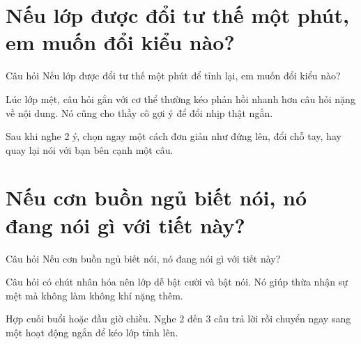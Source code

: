 \section{Nếu lớp được đổi tư thế một phút, em muốn đổi kiểu nào?}
\begin{cauhoibox}{Câu hỏi}
Nếu lớp được đổi tư thế một phút để tỉnh lại, em muốn đổi kiểu nào?
\end{cauhoibox}
\begin{taisaocoich}
Lúc lớp mệt, câu hỏi gắn với cơ thể thường kéo phản hồi nhanh hơn câu hỏi nặng về nội dung. Nó cũng cho thầy cô gợi ý để đổi nhịp thật ngắn.
\end{taisaocoich}
\begin{goiybien}
Sau khi nghe 2 ý, chọn ngay một cách đơn giản như đứng lên, đổi chỗ tay, hay quay lại nói với bạn bên cạnh một câu.
\end{goiybien}
\ngancach

\section{Nếu cơn buồn ngủ biết nói, nó đang nói gì với tiết này?}
\begin{cauhoibox}{Câu hỏi}
Nếu cơn buồn ngủ biết nói, nó đang nói gì với tiết này?
\end{cauhoibox}
\begin{taisaocoich}
Câu hỏi có chút nhân hóa nên lớp dễ bật cười và bật nói. Nó giúp thừa nhận sự mệt mà không làm không khí nặng thêm.
\end{taisaocoich}
\begin{goiybien}
Hợp cuối buổi hoặc đầu giờ chiều. Nghe 2 đến 3 câu trả lời rồi chuyển ngay sang một hoạt động ngắn để kéo lớp tỉnh lên.
\end{goiybien}
